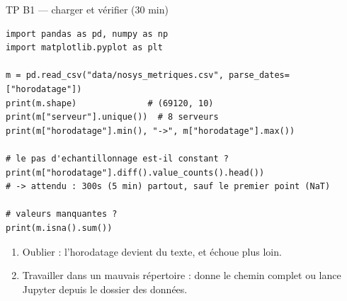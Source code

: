 \begin{frame}[fragile]{TP B1 --- charger et vérifier (30 min)}
\begin{codebox}
\begin{lstlisting}
import pandas as pd, numpy as np
import matplotlib.pyplot as plt

m = pd.read_csv("data/nosys_metriques.csv", parse_dates=["horodatage"])
print(m.shape)              # (69120, 10)
print(m["serveur"].unique())  # 8 serveurs
print(m["horodatage"].min(), "->", m["horodatage"].max())

# le pas d'echantillonnage est-il constant ?
print(m["horodatage"].diff().value_counts().head())
# -> attendu : 300s (5 min) partout, sauf le premier point (NaT)

# valeurs manquantes ?
print(m.isna().sum())
\end{lstlisting}
\end{codebox}
\begin{wbox}
\begin{enumerate}
\item Oublier  : l'horodatage devient du texte,
et  échoue plus loin.
\item Travailler dans un mauvais répertoire : donne le chemin complet
ou lance Jupyter depuis le dossier des données.
\end{enumerate}
\end{wbox}
\end{frame}

